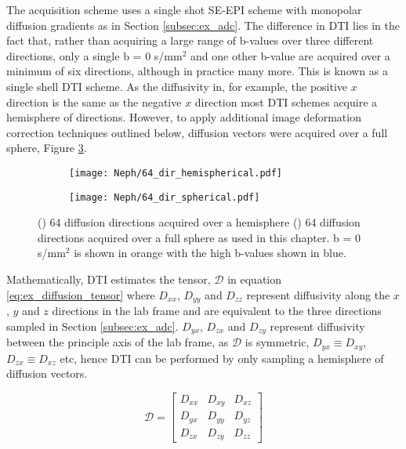 The acquisition scheme uses a single shot \ac{SE}-\ac{EPI} scheme with monopolar diffusion gradients as in Section \ref{subsec:ex_adc}. The difference in \ac{DTI} lies in the fact that, rather than acquiring a large range of b-values over three different directions, only a single b = 0 s/mm$^2$ and one other b-value are acquired over a minimum of six directions, although in practice many more. This is known as a single shell \ac{DTI} scheme. As the diffusivity in, for example, the positive $x$ direction is the same as the negative $x$ direction most \ac{DTI} schemes acquire a hemisphere of directions. However, to apply additional image deformation correction techniques outlined below, diffusion vectors were acquired over a full sphere, Figure \ref{fig:ex_dti_vectors}.

\begin{figure}[H]
	\centering
	\begin{subfigure}[c]{0.47\textwidth}
		\centering
		\texttt{[image: Neph/64\_dir\_hemispherical.pdf]}
		\caption{}
		\label{fig:ex_dti_vectors_half}
	\end{subfigure}
	\hfill
	\begin{subfigure}[c]{0.47\textwidth}
		\centering
		\texttt{[image: Neph/64\_dir\_spherical.pdf]}
		\caption{}
		\label{fig:ex_dti_vectors_full}
	\end{subfigure}
	\caption{() 64 diffusion directions acquired over a hemisphere () 64 diffusion directions acquired over a full sphere as used in this chapter. b = 0 s/mm$^2$ is shown in orange with the high b-values shown in blue. }
	\label{fig:ex_dti_vectors}
\end{figure}

Mathematically, \ac{DTI} estimates the tensor, $\mathscr{D}$ in equation \eqref{eq:ex_diffusion_tensor} where $D_{xx}$, $D_{yy}$ and $D_{zz}$ represent diffusivity along the $x$, $y$ and $z$ directions in the lab frame and are equivalent to the three directions sampled in Section \ref{subsec:ex_adc}. $D_{yx}$, $D_{zx}$ and $D_{zy}$ represent diffusivity between the principle axis of the lab frame, as $\mathscr{D}$ is symmetric, $D_{yx} \equiv D_{xy}$, $D_{zx} \equiv D_{xz}$ etc, hence \ac{DTI} can be performed by only sampling a hemisphere of diffusion vectors.

\begin{equation}
	\mathscr{D} = 
	\begin{bmatrix}
		D_{xx} & D_{xy} & D_{xz}\\ 
		D_{yx} & D_{yy} & D_{yz}\\ 
		D_{zx} & D_{zy} & D_{zz}
	\end{bmatrix}
\label{eq:ex_diffusion_tensor}
\end{equation}

